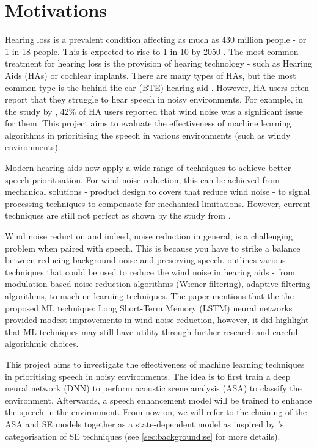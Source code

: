 \documentclass[logo,bsc,singlespacing,parskip,online]{infthesis}
\begin{document}
\section{Motivations}
Hearing loss is a prevalent condition affecting as much as 
430 million people - or 1 in 18 people. This is expected 
to rise to 1 in 10 by 2050 \citep{WHO2024deafness}.
The most common treatment for hearing loss is the 
provision of hearing technology - such as Hearing Aids (HAs) or cochlear implants.
There are many types of HAs, but the most common
type is the behind-the-ear (BTE) hearing aid \citep{Kochkin2010MarkeTrak8}.
However, HA users often report that they struggle to hear speech
in noisy environments. For example, in the study by \citet{Kochkin2010MarkeTrak8},
42\% of HA users reported that wind noise was a significant issue for them.
This project aims to evaluate the effectiveness of machine learning algorithms
in prioritising the speech in various environments (such as windy environments).

Modern hearing aids now apply a wide range of techniques to achieve 
better speech prioritisation. For wind noise reduction, this can be achieved 
from mechanical solutions - product design to covers that reduce wind noise - to 
signal processing techniques to compensate for mechanical limitations.
However, current techniques are still not perfect as shown by the study from \citet{Kochkin2010MarkeTrak8}.

Wind noise reduction and indeed, noise reduction in general, is a challenging problem
when paired with speech. This is because you have 
to strike a balance between reducing background noise and
preserving speech. 
\citet{Korhonen2021WindNoise} outlines 
various techniques that could be used to reduce the wind noise in hearing aids -
from modulation-based noise reduction algorithms (Wiener filtering),
adaptive filtering algorithms, to machine learning techniques.
The paper mentions that the the proposed ML technique:
Long Short-Term Memory (LSTM) neural networks provided
modest improvements in wind noise reduction, however, it did highlight
that ML techniques may still have utility through further research 
and careful algorithmic choices. 

This project aims to investigate the effectiveness of machine learning techniques 
in prioritising speech in noisy environments. The idea is to 
first train a deep neural network (DNN) to perform acoustic scene analysis (ASA) to classify the environment.
Afterwards, a speech enhancement model will be trained to enhance the speech in the environment.
From now on, we will refer to the chaining of the ASA and SE models together as a state-dependent model
as inspired by \citet{katagiri_handbook_2000}'s categorisation of SE techniques (see \ref{sec:background:se} for more details).
\end{document}
